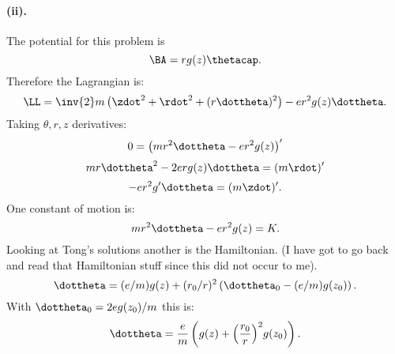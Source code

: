 {\paragraph{(ii).}
%
The potential for this problem is
%
\begin{equation}\label{eqn:tongMf1:2000}
\BA =  r g(z) \thetacap.
\end{equation}
%
Therefore the Lagrangian is:
\begin{equation}\label{eqn:tongMf1:2020}
\LL = \inv{2} m \left(\zdot^2 + \rdot^2 + (r\dottheta)^2\right) - e r^2 g(z) \dottheta.
\end{equation}
%
Taking \(\theta, r, z\) derivatives:
\begin{equation}\label{eqn:tongMf1:2040}
0 = \left(mr^2 \dottheta - e r^2 g(z)\right)'
\end{equation}
\begin{equation}\label{eqn:tongMf1:2060}
mr \dottheta^2 - 2 e r g(z) \dottheta = (m \rdot)'
\end{equation}
\begin{equation}\label{eqn:tongMf1:2080}
-e r^2 g' \dottheta = ( m \zdot )'.
\end{equation}
%
One constant of motion is:
%
\begin{equation}\label{eqn:tongMf1:2100}
mr^2 \dottheta - e r^2 g(z) = K.
\end{equation}
%
Looking at Tong's solutions another is the Hamiltonian.  (I have got to go back and read that Hamiltonian stuff since this did not occur to me).
%
\begin{equation}\label{eqn:tongMf1:2120}
\dottheta = (e/m) g(z) + (r_0/r)^2 \left(\dottheta_0 - (e/m) g(z_0)\right).
\end{equation}
%
With \(\dottheta_0 = 2 e g(z_0)/m\) this is:
%
\begin{equation}\label{eqn:tongMf1:2140}
\dottheta = \frac{e}{m} \left(g(z) + {\left(\frac{r_0}{r}\right)}^2 g(z_0)\right).
\end{equation}
%
}
%
